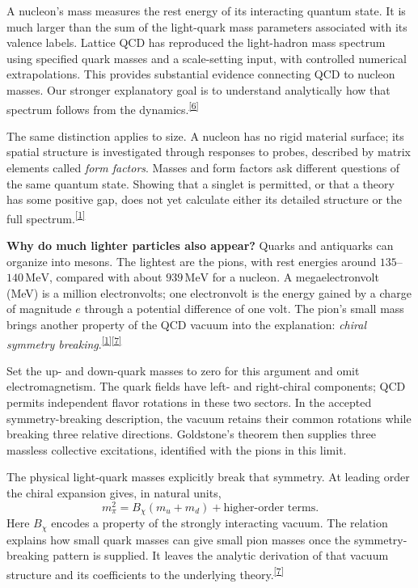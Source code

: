 \documentclass[11pt]{article}
\newcommand{\refn}[1]{\textsuperscript{\hyperlink{src#1}{[#1]}}}
\begin{document}
A nucleon's mass measures the rest energy of its interacting quantum state. It is much larger than the sum of the light-quark mass parameters associated with its valence labels. Lattice QCD has reproduced the light-hadron mass spectrum using specified quark masses and a scale-setting input, with controlled numerical extrapolations. This provides substantial evidence connecting QCD to nucleon masses. Our stronger explanatory goal is to understand analytically how that spectrum follows from the dynamics.\refn{6}

The same distinction applies to size. A nucleon has no rigid material surface; its spatial structure is investigated through responses to probes, described by matrix elements called \emph{form factors}. Masses and form factors ask different questions of the same quantum state. Showing that a singlet is permitted, or that a theory has some positive gap, does not yet calculate either its detailed structure or the full spectrum.\refn{1}

\textbf{Why do much lighter particles also appear?} Quarks and antiquarks can organize into mesons. The lightest are the pions, with rest energies around $135$--$140\,\mathrm{MeV}$, compared with about $939\,\mathrm{MeV}$ for a nucleon. A megaelectronvolt (MeV) is a million electronvolts; one electronvolt is the energy gained by a charge of magnitude $e$ through a potential difference of one volt. The pion's small mass brings another property of the QCD vacuum into the explanation: \emph{chiral symmetry breaking}.\refn{1}\refn{7}

Set the up- and down-quark masses to zero for this argument and omit electromagnetism. The quark fields have left- and right-chiral components; QCD permits independent flavor rotations in these two sectors. In the accepted symmetry-breaking description, the vacuum retains their common rotations while breaking three relative directions. Goldstone's theorem then supplies three massless collective excitations, identified with the pions in this limit.

The physical light-quark masses explicitly break that symmetry. At leading order the chiral expansion gives, in natural units,
\[
 m_\pi^2=B_\chi(m_u+m_d)+\text{higher-order terms}.
\]
Here $B_\chi$ encodes a property of the strongly interacting vacuum. The relation explains how small quark masses can give small pion masses once the symmetry-breaking pattern is supplied. It leaves the analytic derivation of that vacuum structure and its coefficients to the underlying theory.\refn{7}
\end{document}
